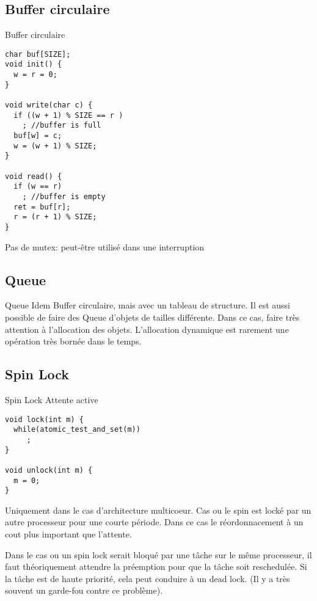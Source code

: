 \subsection{Buffer circulaire}

\begin{frame}[fragile]{Buffer circulaire}
\begin{lstlisting}
char buf[SIZE]; 
void init() {
  w = r = 0;
}

void write(char c) {
  if ((w + 1) % SIZE == r )
    ; //buffer is full
  buf[w] = c;
  w = (w + 1) % SIZE;
}

void read() {
  if (w == r)
    ; //buffer is empty
  ret = buf[r];
  r = (r + 1) % SIZE;
}
\end{lstlisting} 

Pas de mutex: peut-être utilisé dans une interruption
\end{frame} 

\subsection{Queue}

\begin{frame}{Queue}
Idem  Buffer circulaire,  mais avec  un tableau  de structure.  Il est
aussi possible de faire des Queue d'objets de tailles différente. Dans
ce cas,  faire très attention à l'allocation  des objets. L'allocation
dynamique est rarement une opération très bornée dans le temps.
\end{frame} 

\subsection{Spin Lock}
\begin{frame}[fragile]{Spin Lock}
Attente active
\begin{lstlisting} 
void lock(int m) {
  while(atomic_test_and_set(m))
     ;
}

void unlock(int m) {
  m = 0;
}
\end{lstlisting} 

Uniquement dans le  cas d'architecture multicoeur. Cas ou  le spin est
locké par un autre processeur pour  une courte période. Dans ce cas le
réordonnacement à un cout plus important que l'attente.

Dans le cas  ou un spin lock  serait bloqué par une tâche  sur le même
processeur, il  faut théoriquement attendre la préemption  pour que la
tâche soit reschedulée.  Si la tâche est de  haute priorité, cela peut
conduire à un  dead lock. (Il y a très souvent  un garde-fou contre ce
problème).
\end{frame} 

